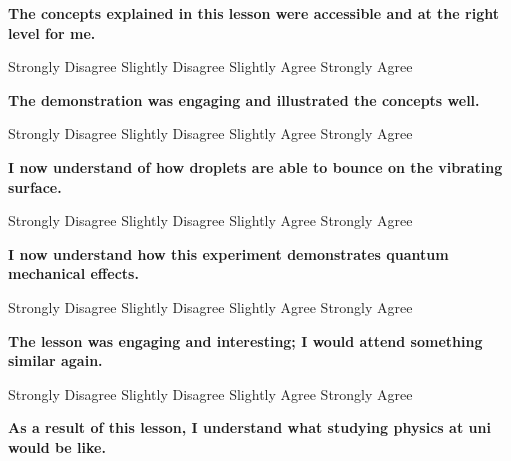 \noindent \textbf{The concepts explained in this lesson were accessible and at the right level for me.}

\vspace{3mm}
Strongly Disagree\hspace{1.5cm}	Slightly Disagree\hspace{1.5cm}	Slightly Agree\hspace{1.5cm}		Strongly Agree
\vspace{3mm}

\noindent \textbf{The demonstration was engaging and illustrated the concepts well.}

\vspace{3mm}
Strongly Disagree\hspace{1.5cm}	Slightly Disagree\hspace{1.5cm}	Slightly Agree\hspace{1.5cm}		Strongly Agree
\vspace{3mm}

\noindent \textbf{I now understand of how droplets are able to bounce on the vibrating surface.}

\vspace{3mm}
Strongly Disagree\hspace{1.5cm}	Slightly Disagree\hspace{1.5cm}	Slightly Agree\hspace{1.5cm}		Strongly Agree
\vspace{3mm}

\noindent \textbf{I now understand how this experiment demonstrates quantum mechanical effects.}

\vspace{3mm}
Strongly Disagree\hspace{1.5cm}	Slightly Disagree\hspace{1.5cm}	Slightly Agree\hspace{1.5cm}		Strongly Agree
\vspace{3mm}

\noindent \textbf{The lesson was engaging and interesting; I would attend something similar again.}

\vspace{3mm}
Strongly Disagree\hspace{1.5cm}	Slightly Disagree\hspace{1.5cm}	Slightly Agree\hspace{1.5cm}		Strongly Agree
\vspace{3mm}

\noindent \textbf{As a result of this lesson, I understand what studying physics at uni would be like.}

